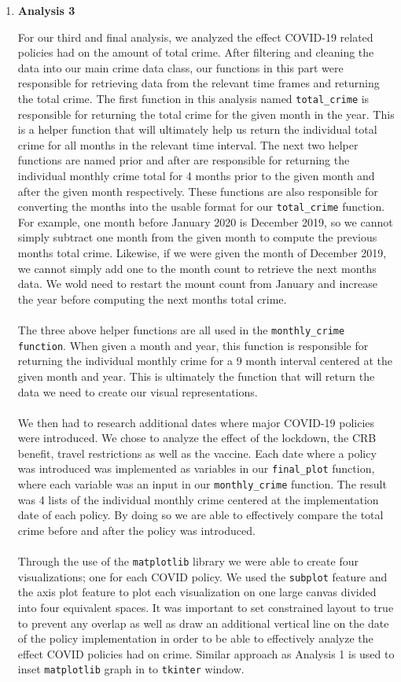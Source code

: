 \documentclass[fontsize=11pt]{article}
\begin{document}
\begin{enumerate}
\item \textbf{Analysis 3}

For our third and final analysis, we analyzed the effect COVID-19 related policies had on the amount of total crime. After filtering and cleaning the data into our main crime data class, our functions in this part were responsible for retrieving data from the relevant time frames and returning the total crime. The first function in this analysis named \texttt{total\_crime} is responsible for returning the total crime for the given month in the year. This is a helper function that will ultimately help us return the individual total crime for all months in the relevant time interval. The next two helper functions are named prior and after are responsible for returning the individual monthly crime total for 4 months prior to the given month and after the given month respectively. These functions are also responsible for converting the months into the usable format for our \texttt{total\_crime} function. For example, one month before January 2020 is December 2019, so we cannot simply subtract one month from the given month to compute the previous months total crime. Likewise, if we were given the month of December 2019, we cannot simply add one to the month count to retrieve the next months data. We wold need to restart the mount count from January and increase the year before computing the next months total crime. 
\\
\\
The three above helper functions are all used in the \texttt{monthly\_crime function}. When given a month and year, this function is responsible for returning the individual monthly crime for a 9 month interval centered at the given month and year. This is ultimately the function that will return the data we need to create our visual representations. 
\\
\\
We then had to research additional dates where major COVID-19 policies were introduced. We chose to analyze the effect of the lockdown, the CRB benefit, travel restrictions as well as the vaccine. Each date where a policy was introduced was implemented as variables in our \texttt{final\_plot} function, where each variable was an input in our \texttt{monthly\_crime} function. The result was 4 lists of the individual monthly crime centered at the implementation date of each policy. By doing so we are able to effectively compare the total crime before and after the policy was introduced. 
\\
\\
Through the use of the \texttt{matplotlib} library we were able to create four visualizations; one for each COVID policy. We used the \texttt{subplot} feature and the axis plot feature to plot each visualization on one large canvas divided into four equivalent spaces. It was important to set constrained layout to true to prevent any overlap as well as draw an additional vertical line on the date of the policy implementation in order to be able to effectively analyze the effect COVID policies had on crime. Similar approach as Analysis 1 is used to inset \texttt{matplotlib} graph in to \texttt{tkinter} window.


\end{enumerate}
\end{document}
